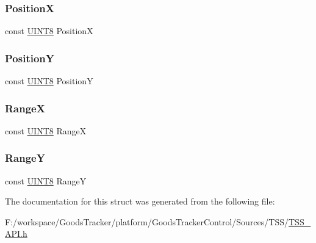 \subsubsection{\texorpdfstring{PositionX}{PositionX}}
{\footnotesize\ttfamily const \hyperlink{_t_s_s___data_types_8h_ab27e9918b538ce9d8ca692479b375b6a}{U\+I\+N\+T8} PositionX}

\mbox{\label{struct_t_s_s___c_s_matrix_aac24d6e91ed086564e138c28e7bdb734}} 
\subsubsection{\texorpdfstring{PositionY}{PositionY}}
{\footnotesize\ttfamily const \hyperlink{_t_s_s___data_types_8h_ab27e9918b538ce9d8ca692479b375b6a}{U\+I\+N\+T8} PositionY}

\mbox{\label{struct_t_s_s___c_s_matrix_a93ec03e0fdd72db4648b7b80b6644626}} 
\subsubsection{\texorpdfstring{RangeX}{RangeX}}
{\footnotesize\ttfamily const \hyperlink{_t_s_s___data_types_8h_ab27e9918b538ce9d8ca692479b375b6a}{U\+I\+N\+T8} RangeX}

\mbox{\label{struct_t_s_s___c_s_matrix_ad2220b46256b31b618d1900e724cb862}} 
\subsubsection{\texorpdfstring{RangeY}{RangeY}}
{\footnotesize\ttfamily const \hyperlink{_t_s_s___data_types_8h_ab27e9918b538ce9d8ca692479b375b6a}{U\+I\+N\+T8} RangeY}



The documentation for this struct was generated from the following file\+:\begin{DoxyCompactItemize}
\item 
F\+:/workspace/\+Goods\+Tracker/platform/\+Goods\+Tracker\+Control/\+Sources/\+T\+S\+S/\hyperlink{_t_s_s___a_p_i_8h}{T\+S\+S\+\_\+\+A\+P\+I.\+h}\end{DoxyCompactItemize}
